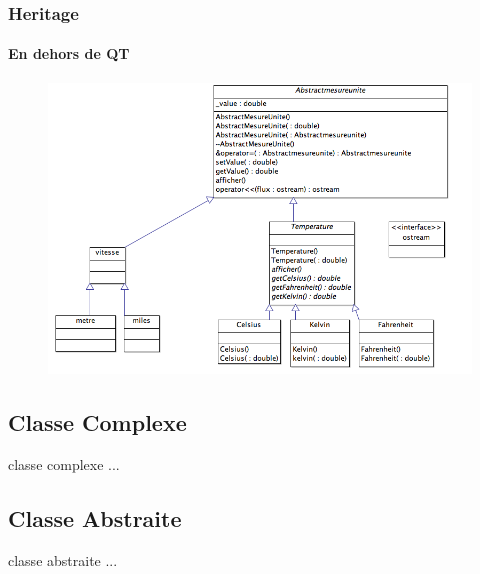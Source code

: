 \documentclass[10pt]{beamer}
\begin{document}
\begin{frame}[fragile]
  \frametitle{Heritage}
  \framesubtitle{En dehors de QT}
  \begin{center}
    \begin{figure}
      \includegraphics[scale=0.4]{img/Diagrammedeclasses.png}
    \end{figure}
  \end{center}
\end{frame}

  \subsection{Classe Complexe}
\begin{frame}
  classe complexe ...
\end{frame}
  \subsection{Classe Abstraite}
\begin{frame}
  classe abstraite ...
\end{frame}
\end{document}
